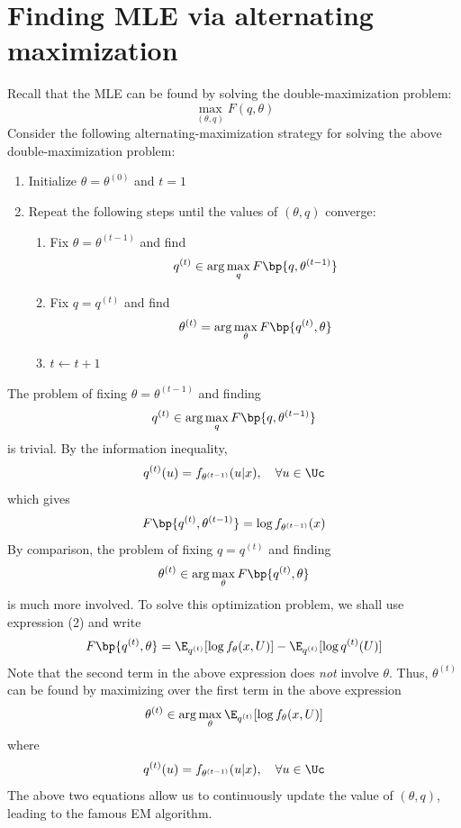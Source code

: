 \section{Finding MLE via alternating maximization}
Recall that the MLE can be found by solving the double-maximization problem:
\[
    \max_{(\theta, q)} F(q, \theta)
\]
Consider the following alternating-maximization strategy for solving the above double-maximization problem:
\begin{enumerate}
    \item Initialize $\theta = \theta^{(0)}$ and $t=1$
    \item Repeat the following steps until the values of $(\theta, q)$ converge:
          \begin{enumerate}
              \item Fix $\theta = \theta^{(t-1)}$ and find
                    \[
                        q^{(t)} \in \arg\max_{q}F\bp{q,\theta^{(t-1)}}
                    \]
              \item Fix $q = q^{(t)}$ and find
                    \[
                        \theta^{(t)} = \arg\max_{\theta}F\bp{q^{(t)}, \theta}
                    \]
              \item $t \leftarrow t + 1$
          \end{enumerate}
\end{enumerate}
The problem of fixing $\theta = \theta^{(t-1)}$ and finding
\[
    q^{(t)} \in \arg\max_{q}F\bp{q,\theta^{(t-1)}}
\]
is trivial. By the information inequality,
\[
    q^{(t)}(u) = f_{\theta^{(t-1)}} (u|x),\quad\forall u\in\Uc
\]
which gives
\[
    F\bp{q^{(t)}, \theta^{(t-1)}} = \log f_{\theta^{(t-1)}}(x)
\]
By comparison, the problem of fixing $q=q^{(t)}$ and finding
\[
    \theta^{(t)} \in \arg\max_{\theta}F\bp{q^{(t)},\theta}
\]
is much more involved. To solve this optimization problem, we shall use expression (2) and write %
\[
    F\bp{q^{(t)}, \theta} = \E_{q^{(t)}} [ \log f_\theta(x, U)] - \E_{q^{(t)}} [\log q^{(t)}(U)]
\]
Note that the second term in the above expression does \textit{not} involve $\theta$. Thus, $\theta^{(t)}$ can be found by maximizing
over the first term in the above expression
\[
    \theta^{(t)} \in \arg\max_{\theta} \E_{q^{(t)}} [\log f_\theta(x, U)]
\]
where
\[
    q^{(t)} (u) = f_{\theta^{(t-1)}} (u | x), \quad\forall u\in\Uc
\]
The above two equations allow us to continuously update the value of $(\theta, q)$, leading to the famous EM algorithm.

